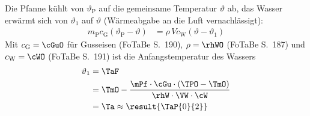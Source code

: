 Die Pfanne kühlt von $\vartheta_\text{P}$ auf die gemeinsame Temperatur $\vartheta$ ab, das Wasser erwärmt sich von $\vartheta_1$ auf $\vartheta$ (Wärmeabgabe an die Luft vernachlässigt):
\begin{align}
 m_\text{P}c_\text{G}\left(\vartheta_\text{P}-\vartheta\right) &= \rho\,V c_\text{W}\left(\vartheta-\vartheta_1\right)
\end{align}
Mit $c_\text{G} = \cGuO$ für Gusseisen (FoTaBe S.~190), $\rho = \rhWO$ (FoTaBe S.~187) und $c_\text{W} = \cWO$ (FoTaBe S.~191) ist die Anfangstemperatur des Wassers
\begin{align}
 \vartheta_1 &= \TaF \\
   &= \TmO-\frac{\mPf\cdot\cGu\cdot\left(\TPO-\TmO\right)}{\rhW\cdot\VW\cdot\cW} \\
   &= \Ta \approx \result{\TaP{0}{2}}
\end{align}
